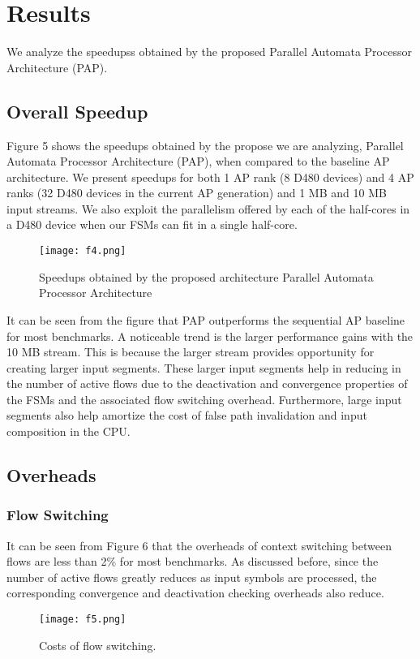 \section{\textbf{Results}}
We analyze the speedupss obtained by the proposed Parallel Automata Processor Architecture (PAP).
\subsection{Overall Speedup}
Figure 5 shows the speedups obtained by the propose we are analyzing, Parallel
Automata Processor Architecture (PAP), when compared to the
baseline AP architecture. We present speedups for both 1 AP rank
(8 D480 devices) and 4 AP ranks (32 D480 devices in the current
AP generation) and 1 MB and 10 MB input streams. We also exploit
the parallelism offered by each of the half-cores in a D480 device
when our FSMs can fit in a single half-core. 
\begin{figure}[t]
    \texttt{[image: f4.png]}
    \centering
    \caption{Speedups obtained by the proposed architecture Parallel Automata Processor Architecture}
\end{figure}

It can be seen from the figure that PAP outperforms the sequential
AP baseline for most benchmarks. A noticeable trend is the larger
performance gains with the 10 MB stream. This is because the larger stream provides opportunity for creating larger input segments.
These larger input segments help in reducing in the number of active
flows due to the deactivation and convergence properties of the
FSMs  and the associated flow
switching overhead. Furthermore, large input segments also help
amortize the cost of false path invalidation and input composition
in the CPU.

\subsection{Overheads}

\subsubsection{Flow Switching}
It can be seen from Figure 6  that the overheads of context switching between flows are
less than 2\% for most benchmarks. As discussed before, since the
number of active flows greatly reduces as input symbols are processed, the corresponding convergence and deactivation checking
overheads also reduce.
\begin{figure}[!]
\texttt{[image: f5.png]}
\centering
\caption{Costs of flow switching.}
\end{figure}


